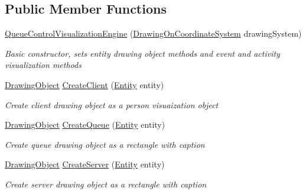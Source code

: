 \subsection*{Public Member Functions}
\begin{DoxyCompactItemize}
\item 
\hyperlink{class_simple_queue_example_1_1_drawing_1_1_queue_control_visualization_engine_aa719d9a35b8d3668e837814b5f8823fd}{Queue\+Control\+Visualization\+Engine} (\hyperlink{class_w_p_f_visualization_base_1_1_drawing_on_coordinate_system}{Drawing\+On\+Coordinate\+System} drawing\+System)
\begin{DoxyCompactList}\small\item\em Basic constructor, sets entity drawing object methods and event and activity visualization methods \end{DoxyCompactList}\item 
\hyperlink{class_w_p_f_visualization_base_1_1_drawing_object}{Drawing\+Object} \hyperlink{class_simple_queue_example_1_1_drawing_1_1_queue_control_visualization_engine_ae79c189749a1ba8e13329e8c1df3800d}{Create\+Client} (\hyperlink{class_simulation_core_1_1_h_c_c_m_elements_1_1_entity}{Entity} entity)
\begin{DoxyCompactList}\small\item\em Create client drawing object as a person visuaization object \end{DoxyCompactList}\item 
\hyperlink{class_w_p_f_visualization_base_1_1_drawing_object}{Drawing\+Object} \hyperlink{class_simple_queue_example_1_1_drawing_1_1_queue_control_visualization_engine_a4b8a443822834b14bfb27f0a2416152d}{Create\+Queue} (\hyperlink{class_simulation_core_1_1_h_c_c_m_elements_1_1_entity}{Entity} entity)
\begin{DoxyCompactList}\small\item\em Create queue drawing object as a rectangle with caption \end{DoxyCompactList}\item 
\hyperlink{class_w_p_f_visualization_base_1_1_drawing_object}{Drawing\+Object} \hyperlink{class_simple_queue_example_1_1_drawing_1_1_queue_control_visualization_engine_a5b25c4278777823d8071edb2051c0a87}{Create\+Server} (\hyperlink{class_simulation_core_1_1_h_c_c_m_elements_1_1_entity}{Entity} entity)
\begin{DoxyCompactList}\small\item\em Create server drawing object as a rectangle with caption \end{DoxyCompactList}\item 

\end{DoxyCompactItemize}
